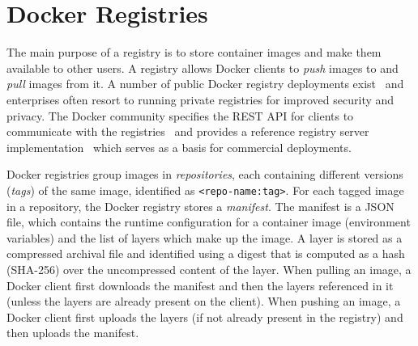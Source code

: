 \section{Docker Registries}
\label{sec:background}


%
%

%
The main purpose of a registry is to store container images and make them available
to other users.
%
A registry allows Docker clients to \emph{push} images to and \emph{pull}
images from it.
%
A number of public Docker registry deployments
exist~\cite{docker-hub,amazon-ecr,jfrog-artifactory,azure-cr,google-cr} and
enterprises often resort to running private registries for improved security
and privacy.
%
The Docker community specifies the REST API for clients to communicate with the
registries~\cite{docker-registry-api} and provides a reference registry server implementation~\cite{docker-registry-software} which serves as
a basis for commercial deployments.





Docker registries group images in \emph{repositories}, each containing
different versions (\emph{tags}) of the same image, identified as
\texttt{<repo-name:tag>}.
%
For each tagged image in a repository, the Docker registry stores a \emph{manifest}.
%
The manifest is a JSON file, which contains the runtime configuration for a
container image (\eg environment variables) and the list of layers which make
up the image.
%
A layer is stored as a compressed archival file and identified using a digest that is computed as a hash (SHA-256) over
the uncompressed content of the layer.
%
When pulling an image, a Docker client first downloads the manifest and then the
layers referenced in it (unless the layers are already present on the client).
%
When pushing an image, a Docker client first uploads the layers (if not already present in
the registry) and then uploads the manifest.





